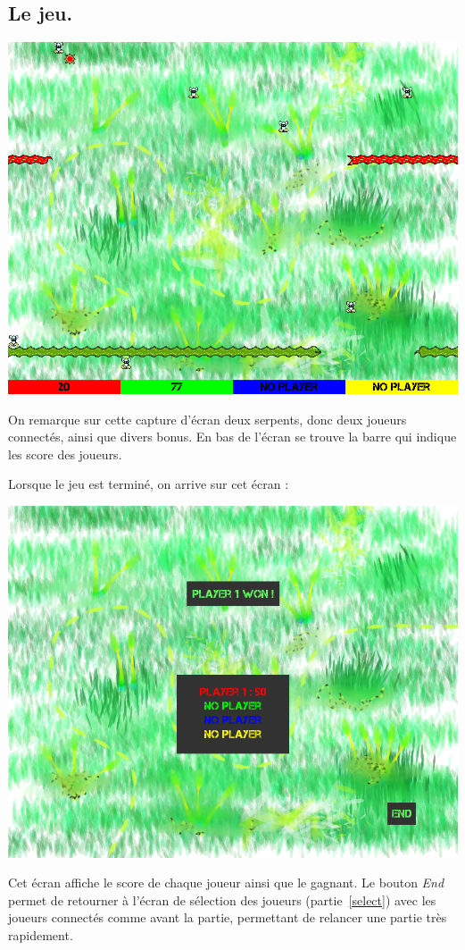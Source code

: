 \documentclass{article}
\begin{document}
\subsection{Le jeu.} \label{game}
\begin{center}
	\includegraphics[scale=0.4]{img/game.png}
\end{center}
On remarque sur cette capture d'écran deux serpents, donc deux joueurs connectés, ainsi que divers bonus. En bas de l'écran se trouve la barre qui indique les score des joueurs.

Lorsque le jeu est terminé, on arrive sur cet écran :
\begin{center}
	\includegraphics[scale=0.4]{img/game_over.png}
\end{center}
Cet écran affiche le score de chaque joueur ainsi que le gagnant. Le bouton \emph{End} permet de retourner à l'écran de sélection des joueurs (partie~\ref{select}) avec les joueurs connectés comme avant la partie, permettant de relancer une partie très rapidement.
\end{document}
